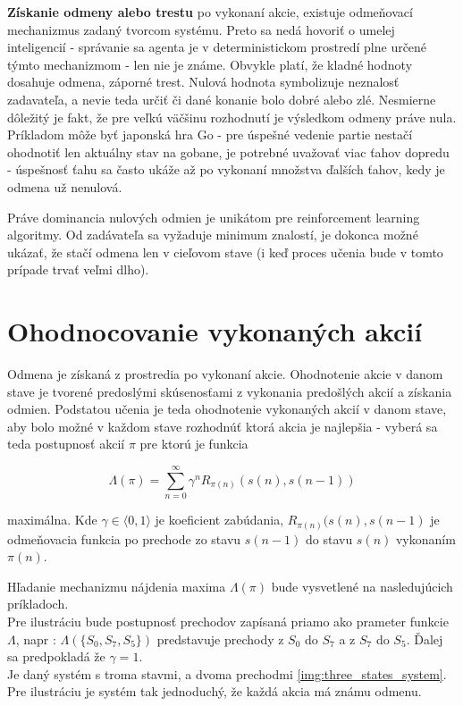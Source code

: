 {\bf Získanie odmeny alebo trestu} po vykonaní akcie, existuje odmeňovací mechanizmus
zadaný tvorcom systému. Preto sa nedá hovoriť o umelej inteligencií - správanie
sa agenta je v deterministickom prostredí plne určené týmto mechanizmom - len nie je známe.
Obvykle platí, že kladné hodnoty dosahuje odmena, záporné trest. Nulová hodnota symbolizuje
neznalosť zadavateľa, a nevie teda určiť či dané konanie bolo dobré alebo zlé.
Nesmierne dôležitý je fakt, že pre veľkú väčšinu rozhodnutí je výsledkom odmeny práve nula.
Príkladom môže byť japonská hra Go - pre úspešné vedenie partie nestačí ohodnotiť
len aktuálny stav na gobane, je potrebné uvažovať viac ťahov dopredu - úspešnosť
ťahu sa často ukáže až po vykonaní množstva ďalších ťahov, kedy je odmena už nenulová.

Práve dominancia nulových odmien je unikátom pre reinforcement learning algoritmy.
Od zadávateľa sa vyžaduje minimum znalostí, je dokonca možné ukázať, že stačí
odmena len v cieľovom stave (i keď proces učenia bude v tomto prípade trvať veľmi dlho).


\section{Ohodnocovanie vykonaných akcií}

Odmena je získaná z prostredia po vykonaní akcie. Ohodnotenie akcie v danom stave
je tvorené predoslými skúsenosťami z vykonania predošlých akcií a získania odmien.
Podstatou učenia je teda ohodnotenie vykonaných akcií v danom stave, aby bolo
možné v každom stave rozhodnúť ktorá akcia je najlepšia - vyberá sa teda
postupnosť akcií $\pi$ pre ktorú je funkcia

\begin{equation}
\Lambda(\pi)  = \sum\limits_{n=0}^{\infty}\gamma^n R_{\pi(n)}(s(n), s(n-1))
\label{eq:q_quality}
\end{equation}

maximálna. Kde $\gamma \in \langle 0, 1 \rangle$ je koeficient zabúdania, $R_{\pi(n)}{(s(n), s(n-1)}$
je odmeňovacia funkcia po prechode zo stavu $s(n-1)$ do stavu $s(n)$ vykonaním $\pi(n)$.

Hľadanie mechanizmu nájdenia maxima $\Lambda(\pi)$ bude vysvetlené na nasledujúcich príkladoch.
\\
Pre ilustráciu bude postupnosť prechodov zapísaná priamo ako prameter funkcie $\Lambda$, napr :
$\Lambda(\{S_0, S_7, S_5\})$ predstavuje prechody z $S_0$ do $S_7$ a z $S_7$ do $S_5$.
Ďalej sa predpokladá že $\gamma = 1$.
\\
Je daný systém s troma stavmi, a dvoma prechodmi \ref{img:three_states_system}.
Pre ilustráciu je systém tak jednoduchý, že každá akcia má známu odmenu.

